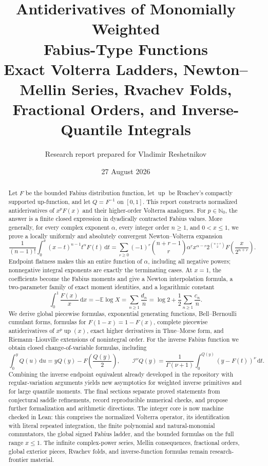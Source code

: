 \documentclass[11pt,oneside]{article}
\title{\bfseries Antiderivatives of Monomially Weighted\\[2mm]
Fabius-Type Functions\\[2mm]
\large Exact Volterra Ladders, Newton--Mellin Series, Rvachev Folds,\\
Fractional Orders, and Inverse-Quantile Integrals}
\author{Research report prepared for Vladimir Reshetnikov}
\date{27 August 2026}
\theoremstyle{definition}
\theoremstyle{remark}
\newcommand{\Up}{\operatorname{up}}
\newcommand{\E}{\mathbb E}
\newcommand{\N}{\mathbb N}
\newcommand{\dd}{\,\mathrm d}
\newcommand{\fall}[2]{#1^{\underline{#2}}}
\newcommand{\RL}{\mathcal I}
\newcommand{\1}{\mathbf 1}
\begin{document}
\maketitle

\begin{abstract}
Let \(F\) be the bounded Fabius distribution function, let \(\Up\) be Rvachev's
compactly supported up-function, and let \(Q=F^{-1}\) on \([0,1]\).  This report
constructs normalized antiderivatives of \(x^pF(x)\) and their higher-order
Volterra analogues.  For \(p\in\N_0\), the answer is a finite closed expression
in dyadically contracted Fabius values.  More generally, for every complex
exponent \(\alpha\), every integer order \(n\geq1\), and \(0<x\leq1\), we prove
a locally uniformly and absolutely convergent Newton--Volterra expansion
\[
 \frac1{(n-1)!}\int_0^x(x-t)^{n-1}t^\alpha F(t)\dd t
 =\sum_{r\geq0}(-1)^r\binom{n+r-1}{r}\fall{\alpha}{r}
 x^{\alpha-r}2^{\binom{n+r}{2}}F\!\left(\frac{x}{2^{n+r}}\right).
\]
Endpoint flatness makes this an entire function of \(\alpha\), including all
negative powers; nonnegative integral exponents are exactly the terminating
cases.  At \(x=1\), the coefficients become the Fabius moments and give a
Newton interpolation formula, a two-parameter family of exact moment
identities, and a logarithmic constant
\[
 \int_0^1\frac{F(x)}x\dd x
 =-\E\log X
 =\sum_{n\geq1}\frac{d_n}{n}
 =\log2+\frac12\sum_{n\geq1}\frac{c_n}{n}.
\]
We derive global piecewise formulas, exponential generating functions,
Bell--Bernoulli cumulant forms, formulas for \(F(1-x)=1-F(x)\), complete
piecewise antiderivatives of \(x^p\Up(x)\), exact higher derivatives in
Thue--Morse form, and Riemann--Liouville extensions of nonintegral order.
For the inverse Fabius function we obtain closed change-of-variable formulas,
including
\[
 \int_0^yQ(u)\dd u=yQ(y)-F\!\left(\frac{Q(y)}2\right),\qquad
 \RL^\nu Q(y)=\frac1{\Gamma(\nu+1)}
 \int_0^{Q(y)}(y-F(t))^\nu\dd t.
\]
Combining the inverse endpoint equivalent already developed in the repository
with regular-variation arguments yields new asymptotics for weighted inverse
primitives and for large quantile moments.  The final sections separate proved
statements from conjectural saddle refinements, record reproducible numerical
checks, and propose further formalization and arithmetic directions.  The
integer core is now machine checked in Lean: this comprises the normalized
Volterra operator, its identification with literal repeated integration, the
finite polynomial and natural-monomial commutators, the global signed Fabius
ladder, and the bounded formulas on the full range \(x\leq1\).  The infinite
complex-power series, Mellin consequences, fractional orders, global exterior
pieces, Rvachev folds, and inverse-function formulas remain research-frontier
material.
\end{abstract}
\end{document}
